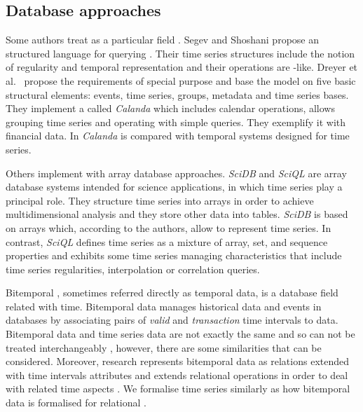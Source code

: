 \subsection{Database approaches}

Some authors treat  as a particular  field
\cite{last01}.  Segev and Shoshani \cite{segev87:sigmod} propose an
structured language for querying . Their time series
structures include the notion of regularity and temporal
representation and their operations are -like.  Dreyer et
al.\ \cite{dreyer94} propose the requirements of special purpose
 and base the model on five basic structural elements:
events, time series, groups, metadata and time series bases. They
implement a  called \emph{Calanda} which includes calendar
operations, allows grouping time series and operating with simple
queries. They exemplify it with financial data. In \cite{schmidt95}
\emph{Calanda} is compared with temporal systems designed for time
series.



 
Others implement  with array database approaches.
\emph{SciDB} \cite{stonebraker09:scidb} and \emph{SciQL}
\cite{zhang11} are array database systems intended for science
applications, in which time series play a principal role. They
structure time series into arrays in order to achieve multidimensional
analysis and they store other data into tables.  \emph{SciDB} is based
on arrays which, according to the authors, allow to represent time
series.  In contrast, \emph{SciQL} defines time series as a mixture of
array, set, and sequence properties and exhibits some time series
managing characteristics that include time series regularities,
interpolation or correlation queries.





Bitemporal , sometimes referred directly as temporal data,
is a database field related with time. Bitemporal data manages
historical data and events in databases by associating pairs of
\emph{valid} and \emph{transaction} time intervals to data.
Bitemporal data and time series data are not exactly the same and so
can not be treated interchangeably \cite{schmidt95}, however, there
are some similarities that can be considered. Moreover, 
research represents bitemporal data as relations extended with time
intervals attributes and extends relational operations in order to
deal with related time aspects
\cite{jensen99:temporaldata,date02:_tempor_data_relat_model}.  We
formalise time series similarly as how bitemporal data is formalised
for relational .



